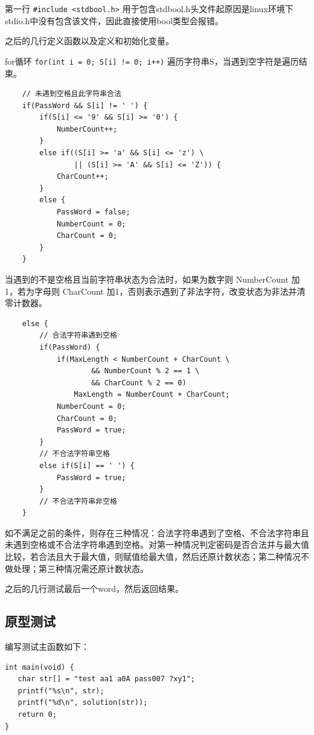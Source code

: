 \begin{spacing}{1.5}
    第一行 \lstinline{#include <stdbool.h>} 用于包含stdbool.h头文件起原因是linux环境下stdio.h中没有包含该文件，因此直接使用bool类型会报错。
    
    之后的几行定义函数以及定义和初始化变量。

    for循环 \lstinline{for(int i = 0; S[i] != 0; i++)} 遍历字符串S，当遇到空字符是遍历结束。

\begin{lstlisting}
    // 未遇到空格且此字符串合法
    if(PassWord && S[i] != ' ') {
        if(S[i] <= '9' && S[i] >= '0') {
            NumberCount++;
        }
        else if((S[i] >= 'a' && S[i] <= 'z') \
                || (S[i] >= 'A' && S[i] <= 'Z')) {
            CharCount++;
        }
        else {
            PassWord = false;
            NumberCount = 0;
            CharCount = 0;
        }
    }
\end{lstlisting}

    当遇到的不是空格且当前字符串状态为合法时，如果为数字则 NumberCount 加1，若为字母则 CharCount 加1，否则表示遇到了非法字符，改变状态为非法并清零计数器。

\begin{lstlisting}
    else {
        // 合法字符串遇到空格
        if(PassWord) {
            if(MaxLength < NumberCount + CharCount \
                    && NumberCount % 2 == 1 \
                    && CharCount % 2 == 0)
                MaxLength = NumberCount + CharCount;
            NumberCount = 0;
            CharCount = 0;
            PassWord = true;
        }
        // 不合法字符串空格
        else if(S[i] == ' ') {
            PassWord = true;
        }
        // 不合法字符串非空格
    }
\end{lstlisting}

    如不满足之前的条件，则存在三种情况：合法字符串遇到了空格、不合法字符串且未遇到空格或不合法字符串遇到空格。对第一种情况判定密码是否合法并与最大值比较，若合法且大于最大值，则赋值给最大值，然后还原计数状态；第二种情况不做处理；第三种情况需还原计数状态。

    之后的几行测试最后一个word，然后返回结果。

    \subsection{原型测试}
    编写测试主函数如下：
\begin{lstlisting}
int main(void) {
   char str[] = "test aa1 a0A pass007 ?xy1";
   printf("%s\n", str);
   printf("%d\n", solution(str));
   return 0;
}
\end{lstlisting}


\end{spacing}
